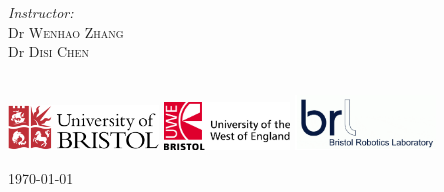 \begin{titlepage}
\begin{minipage}{0.4\textwidth}
\begin{flushleft}
\end{flushleft}

\end{minipage}
\begin{minipage}{0.4\textwidth}
\begin{flushright} \large
\emph{Instructor:} \\
Dr \textsc{Wenhao Zhang} \\
Dr \textsc{Disi Chen} %
\end{flushright}
\end{minipage}\\[1cm]

\includegraphics[width=0.3\textwidth]{images/University_of_Bristol_logo.png}
\hspace{5mm}
\includegraphics[width=0.25\textwidth]{images/UWE_logo.jpg}
\hspace{5mm}
\includegraphics[width=0.28\textwidth]{images/BRL_logo.PNG}

\vspace{2cm}

{\large \today}\\[1cm] %

\vfill %

\end{titlepage}